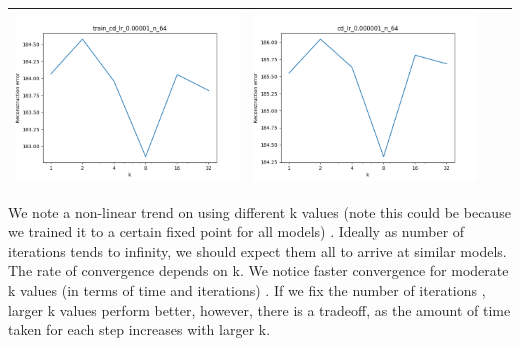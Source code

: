 \documentclass[12pt]{report}
\begin{document}
\begin{table}[H]
\begin{tabular}{ | c | c | c | c |}
\begin{minipage}{.3\textwidth}
      \includegraphics[scale=0.25]{train_cd_lr_0_00001_n_64.png}
    \end{minipage} &
    \begin{minipage}{.3\textwidth}
      \includegraphics[scale=0.25]{cd_lr_0_00001_n_64.png}
    \end{minipage}
    \\ \hline
  \end{tabular}
\end{table}

We note a non-linear trend on using different k values (note this could be because we trained it to a certain fixed point for all models) . Ideally as number of iterations tends to infinity, we should expect them all to arrive at similar models. The rate of convergence depends on k. We notice faster convergence for moderate k values (in terms of time and iterations) . If we fix the number of iterations , larger k values perform better, however, there is a tradeoff, as the amount of time taken for each step increases with larger k.
\end{document}
